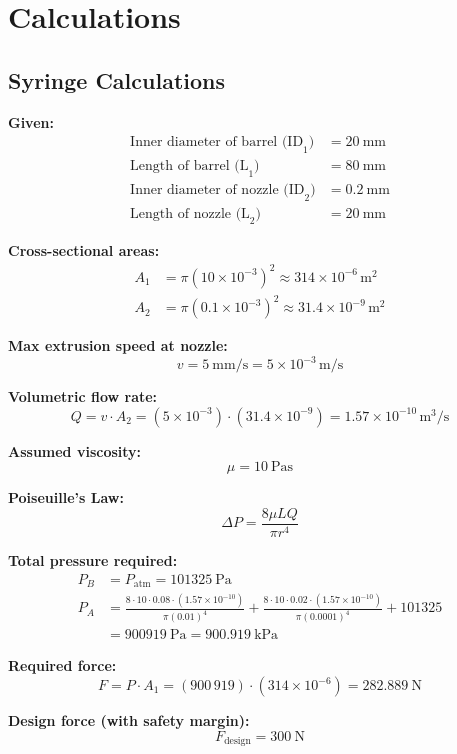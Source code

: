 \chapter{Calculations}

\section{Syringe Calculations}

\textbf{Given:}
\begin{align*}
\text{Inner diameter of barrel (ID}_1\text{)} &= \SI{20}{\milli\meter} \\
\text{Length of barrel (L}_1\text{)} &= \SI{80}{\milli\meter} \\
\text{Inner diameter of nozzle (ID}_2\text{)} &= \SI{0.2}{\milli\meter} \\
\text{Length of nozzle (L}_2\text{)} &= \SI{20}{\milli\meter}
\end{align*}

\textbf{Cross-sectional areas:}
\begin{align*}
A_1 &= \pi \left(10 \times 10^{-3}\right)^2 \approx 314 \times 10^{-6} \, \si{\meter\squared} \\
A_2 &= \pi \left(0.1 \times 10^{-3}\right)^2 \approx 31.4 \times 10^{-9} \, \si{\meter\squared}
\end{align*}

\textbf{Max extrusion speed at nozzle:}
\[
v = \SI{5}{\milli\meter\per\second} = 5 \times 10^{-3} \, \si{\meter\per\second}
\]

\textbf{Volumetric flow rate:}
\[
Q = v \cdot A_2 = (5 \times 10^{-3}) \cdot (31.4 \times 10^{-9}) = 1.57 \times 10^{-10} \, \si{\meter\cubed\per\second}
\]

\textbf{Assumed viscosity:} 
\[
\mu = \SI{10}{\pascal\second}
\]

\textbf{Poiseuille's Law:}
\[
\Delta P = \frac{8 \mu L Q}{\pi r^4}
\]

\textbf{Total pressure required:}
\begin{align*}
P_B &= P_{\text{atm}} = \SI{101325}{\pascal} \\
P_A &= \frac{8 \cdot 10 \cdot 0.08 \cdot (1.57 \times 10^{-10})}{\pi (0.01)^4}
+ \frac{8 \cdot 10 \cdot 0.02 \cdot (1.57 \times 10^{-10})}{\pi (0.0001)^4}
+ 101325 \\
&= \SI{900919}{\pascal} = \SI{900.919}{\kilo\pascal}
\end{align*}

\textbf{Required force:}
\[
F = P \cdot A_1 = (900\,919) \cdot (314 \times 10^{-6}) = \SI{282.889}{\newton}
\]

\textbf{Design force (with safety margin):}
\[
F_{\text{design}} = \SI{300}{\newton}
\]

